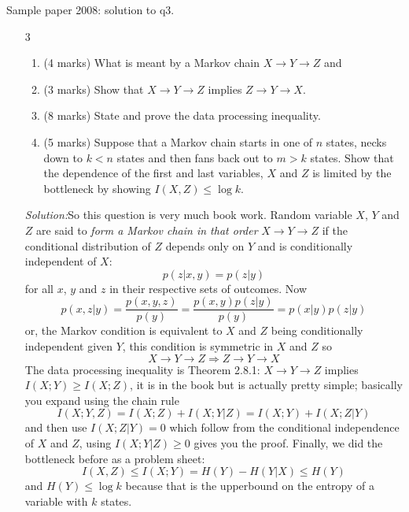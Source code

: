 \documentclass[12pt]{article}
\newcommand{\soln}{\noindent\textit{Solution:}}
\begin{document}
Sample paper 2008: solution to q3.

\begin{enumerate}


\item[3] %
\begin{enumerate}
\item (4 marks) What is meant by a Markov chain $X\rightarrow
  Y\rightarrow Z$ and 
\item (3 marks) Show that $X\rightarrow Y\rightarrow Z$ implies
  $Z\rightarrow Y\rightarrow X$.
\item (8 marks) State and prove the data processing inequality.
\item (5 marks) Suppose that a Markov chain starts in one of $n$ states, necks down to $k<n$ states and then fans back out to $m>k$ states. Show that the dependence of the first and last variables, $X$ and $Z$ is limited by the bottleneck by showing $I(X,Z)\le\log{k}$.
\end{enumerate}

\soln So this question is very much book work. Random variable $X$, $Y$ and $Z$ are said to {\sl form a Markov chain in that order} $X\rightarrow Y \rightarrow Z$ if the conditional distribution of $Z$ depends only on $Y$ and is conditionally independent of $X$:
\begin{equation}
p(z|x,y)=p(z|y)
\end{equation}
for all $x$, $y$ and $z$ in their respective sets of outcomes. Now
\begin{equation}
p(x,z|y)=\frac{p(x,y,z)}{p(y)}=\frac{p(x,y)p(z|y)}{p(y)}=p(x|y)p(z|y)
\end{equation}
or, the Markov condition is equivalent to $X$ and $Z$ being conditionally independent given $Y$, this condition is symmetric in $X$ and $Z$ so
\begin{equation}
X\rightarrow Y \rightarrow Z\Rightarrow Z\rightarrow Y \rightarrow X 
\end{equation}
The data processing inequality is Theorem 2.8.1: $X\rightarrow Y \rightarrow Z$ implies $I(X;Y)\ge I(X;Z)$, it is in the book but is actually pretty simple; basically you expand using the chain rule
\begin{equation}
I(X;Y,Z)=I(X;Z)+I(X;Y|Z)=I(X;Y)+I(X;Z|Y)
\end{equation}
and then use $I(X;Z|Y)=0$ which follow from the conditional independence of $X$ and $Z$, using $I(X;Y|Z)\ge 0$ gives you the proof. Finally, we did the bottleneck before as a problem sheet:
\begin{equation}
I(X,Z)\le I(X;Y)=H(Y)-H(Y|X)\le H(Y)
\end{equation}
and $H(Y)\le\log{k}$ because that is the upperbound on the entropy of
a variable with $k$ states.

\end{enumerate}




\end{document}
